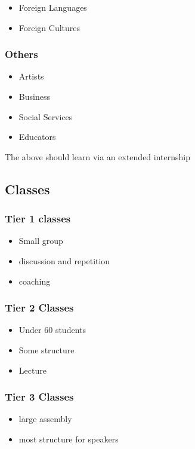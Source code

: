 \documentclass[CSHFoundation.tex]{subfiles}
\begin{document}
\begin{itemize}
\item Foreign Languages
\item Foreign Cultures
\end{itemize}

\subsubsection{Others}

\begin{itemize}
\item Artists
\item Business
\item Social Services
\item Educators
\end{itemize}

The above should learn via an extended internship



\subsection{Classes}

\subsubsection{Tier 1 classes}

\begin{itemize}
\item Small group
\item discussion and repetition
\item coaching
\end{itemize}

\subsubsection{Tier 2 Classes}

\begin{itemize}
\item Under 60 students
\item Some structure
\item Lecture
\end{itemize}

\subsubsection{Tier 3 Classes}

\begin{itemize}
\item large assembly
\item most structure for speakers
\end{itemize}
\end{document}
